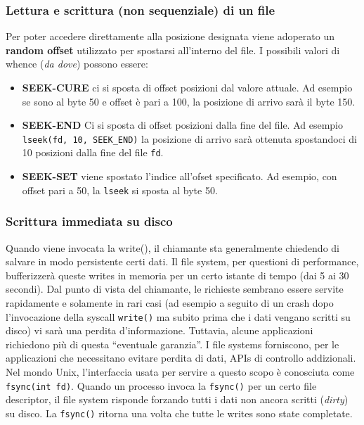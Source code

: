 \documentclass[12pt, letterpaper]{article}
\begin{document}
			\subsubsection{Lettura e scrittura (non sequenziale) di un file}
				Per poter accedere direttamente alla posizione designata viene adoperato un \textbf{random offset} utilizzato per spostarsi all'interno del file. I possibili valori di whence (\textit{da dove}) possono essere:
				\begin{itemize}
					\item \textbf{SEEK-CURE} ci si sposta di offset posizioni dal valore attuale. Ad esempio se sono al byte 50 e offset è pari a 100, la posizione di arrivo sarà il byte 150.
					\item \textbf{SEEK-END} Ci si sposta di offset posizioni dalla fine del file. Ad esempio \texttt{lseek(fd, 10, SEEK\_END)} la posizione di arrivo sarà ottenuta spostandoci di 10 posizioni dalla fine del file \texttt{fd}.
					\item \textbf{SEEK-SET} viene spostato l'indice all'ofset specificato. Ad esempio, con offset pari a 50, la \texttt{lseek} si sposta al byte 50.
				\end{itemize}
				
			\subsubsection{Scrittura immediata su disco}
				Quando viene invocata la write(), il chiamante sta generalmente chiedendo di salvare in modo persistente certi dati. Il file system, per questioni di performance, bufferizzerà queste writes in memoria per un certo istante di tempo (dai 5 ai 30 secondi). Dal punto di vista del chiamante, le richieste sembrano essere servite rapidamente e solamente in rari casi (ad esempio a seguito di un crash dopo l’invocazione della syscall \texttt{write()} ma subito prima che i dati vengano scritti su disco) vi sarà una perdita d’informazione. Tuttavia, alcune applicazioni richiedono più di questa “eventuale garanzia”. I file systems forniscono, per le applicazioni che necessitano evitare perdita di dati, APIs di controllo addizionali. Nel mondo Unix, l’interfaccia usata per servire a questo scopo è conosciuta come \texttt{fsync(int fd)}. Quando un processo invoca la \texttt{fsync()} per un certo file descriptor, il file system risponde forzando tutti i dati non ancora scritti (\textit{dirty}) su disco. La \texttt{fsync()} ritorna una volta che tutte le writes sono state completate.
				
\end{document}
